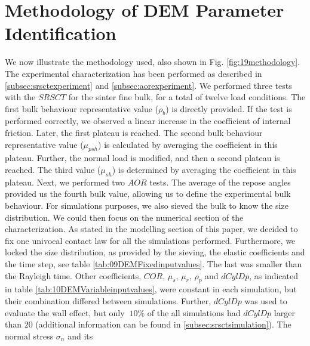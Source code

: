 \section{Methodology of DEM Parameter Identification}
\label{sec:methodology}

We now illustrate the methodology used, also shown in Fig.
\ref{fig:19methodology}.
%
The experimental characterization has been performed as described in
\ref{subsec:srsctexperiment} and \ref{subsec:aorexperiment}. We performed
three tests with the $SRSCT$ for the sinter fine bulk, for a total of twelve
load conditions. 
% 
The first bulk behaviour representative value ($\rho_b$) is directly provided. 
If the test is performed correctly, we observed a linear increase in the
coefficient of internal friction.
Later, the first plateau is reached. 
The second bulk behaviour representative value ($\mu_{psh}$) is calculated by averaging the coefficient in this plateau. 
Further, the normal load is modified, and then a second plateau is reached. The third value ($\mu_{sh}$) is 
determined by averaging the coefficient in this plateau. 
Next, we performed two $AOR$ tests. 
The average of the repose angles provided us the fourth bulk value, allowing us
to define the experimental bulk behaviour.
For simulations purposes, we also sieved the bulk to know the size distribution.
We could then focus on the numerical section of the characterization. 
As stated in the modelling section of this paper, we decided to fix one univocal contact law for all the simulations performed. 
Furthermore, we locked the size distribution, as provided by the sieving, the
elastic coefficients and the time step, see table
\ref{tab:09DEMFixedinputvalues}.
% 
% 
The last was smaller than the Rayleigh time. 
Other coefficients, $COR$, $\mu_s$, $\mu_r$,
$\rho_p$ and $dCylDp$, as indicated in table \ref{tab:10DEMVariableinputvalues},
were constant in each simulation, but their combination differed between
simulations.
% 
Further, $dCylDp$ was used to evaluate the wall effect, but only $~10\%$ of the
all simulations had $dCylDp$ larger than $20$ (additional information can be found in \ref{subsec:srsctsimulation}). 
The normal stress $\sigma_n$ and its
